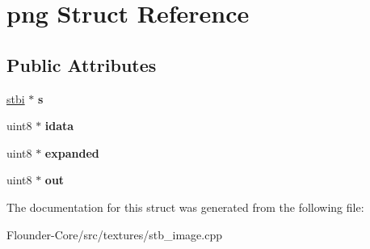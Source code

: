 \hypertarget{structpng}{}\section{png Struct Reference}
\label{structpng}
\subsection*{Public Attributes}
\begin{DoxyCompactItemize}
\item 
\mbox{\label{structpng_a77d3bfd0ae8f598a475317ed39e78fd0}} 
\hyperlink{structstbi}{stbi} $\ast$ {\bfseries s}
\item 
\mbox{\label{structpng_a5cd944fdf0f0417a344bcc538ed98ed6}} 
uint8 $\ast$ {\bfseries idata}
\item 
\mbox{\label{structpng_a474dd0da8ac0347924e68f5de7e68c55}} 
uint8 $\ast$ {\bfseries expanded}
\item 
\mbox{\label{structpng_ada33c39620ad9a647c088c40d21887f6}} 
uint8 $\ast$ {\bfseries out}
\end{DoxyCompactItemize}


The documentation for this struct was generated from the following file\+:\begin{DoxyCompactItemize}
\item 
Flounder-\/\+Core/src/textures/stb\+\_\+image.\+cpp\end{DoxyCompactItemize}
